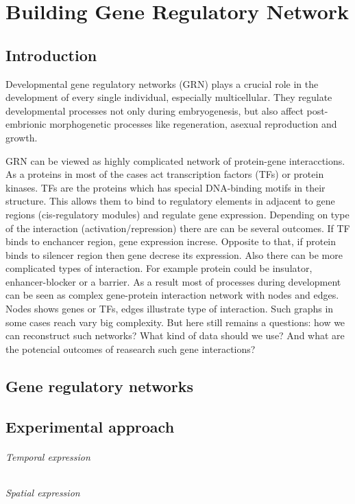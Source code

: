 \documentclass[a4paper, twoside]{report}
\begin{document}
\chapter*{Building Gene Regulatory Network}
\section*{Introduction}

Developmental gene regulatory networks (GRN) plays a crucial role in the development of every single individual, especially multicellular. 
They regulate developmental processes not only during embryogenesis, but also affect post-embrionic morphogenetic processes like regeneration, asexual reproduction and growth.

GRN can be viewed as highly complicated network of protein-gene interacctions. 
As a proteins in most of the cases act transcription factors (TFs) or protein kinases. 
TFs are the proteins which has special DNA-binding motifs in their structure. 
This allows them to bind to regulatory elements in adjacent to gene regions (cis-regulatory modules) and regulate gene expression.
Depending on type of the interaction (activation/repression) there are can be several outcomes.
If TF binds to enchancer region, gene expression increse.
Opposite to that, if protein binds to silencer region then gene decrese its expression.
Also there can be more complicated types of interaction. For example protein could be insulator, enhancer-blocker or a barrier.
As a result most of processes during development can be seen as complex gene-protein interaction network with nodes and edges. 
Nodes shows genes or TFs, edges illustrate type of interaction.
Such graphs in some cases reach vary big complexity.
But here still remains a questions: how we can reconstruct such networks? 
What kind of data should we use? 
And what are the potencial outcomes of reasearch such gene interactions? 

\section*{Gene regulatory networks}

\section*{Experimental approach}

\subparagraph{Temporal expression}

\subparagraph{Spatial expression}
\end{document}
